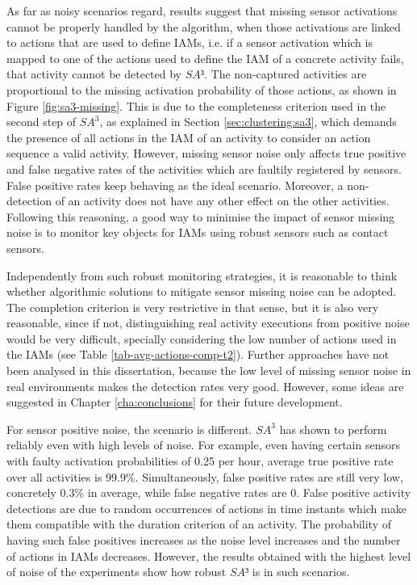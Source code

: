 As far as noisy scenarios regard, results suggest that missing sensor activations cannot be properly handled by the algorithm, when those activations are linked to actions that are used to define IAMs, i.e. if a sensor activation which is mapped to one of the actions used to define the IAM of a concrete activity fails, that activity cannot be detected by $SA³$. The non-captured activities are proportional to the missing activation probability of those actions, as shown in Figure \ref{fig:sa3-missing}. This is due to the completeness criterion used in the second step of $SA^3$, as explained in Section \ref{sec:clustering:sa3}, which demands the presence of all actions in the IAM of an activity to consider an action sequence a valid activity. However, missing sensor noise only affects true positive and false negative rates of the activities which are faultily registered by sensors. False positive rates keep behaving as the ideal scenario. Moreover, a non-detection of an activity does not have any other effect on the other activities. Following this reasoning, a good way to minimise the impact of sensor missing noise is to monitor key objects for IAMs using robust sensors such as contact sensors.  

Independently from such robust monitoring strategies, it is reasonable to think whether algorithmic solutions to mitigate sensor missing noise can be adopted. The completion criterion is very restrictive in that sense, but it is also very reasonable, since if not, distinguishing real activity executions from positive noise would be very difficult, specially considering the low number of actions used in the IAMs (see Table \ref{tab-avg-actions-comp-t2}). Further approaches have not been analysed in this dissertation, because the low level of missing sensor noise in real environments makes the detection rates very good. However, some ideas are suggested in Chapter \ref{cha:conclusions} for their future development.

For sensor positive noise, the scenario is different. $SA^3$ has shown to perform reliably even with high levels of noise. For example, even having certain sensors with faulty activation probabilities of 0.25 per hour, average true positive rate over all activities is 99.9\%. Simultaneously, false positive rates are still very low, concretely 0.3\% in average, while false negative rates are 0. False positive activity detections are due to random occurrences of actions in time instants which make them compatible with the duration criterion of an activity. The probability of having such false positives increases as the noise level increases and the number of actions in IAMs decreases. However, the results obtained with the highest level of noise of the experiments show how robust $SA³$ is in such scenarios.

